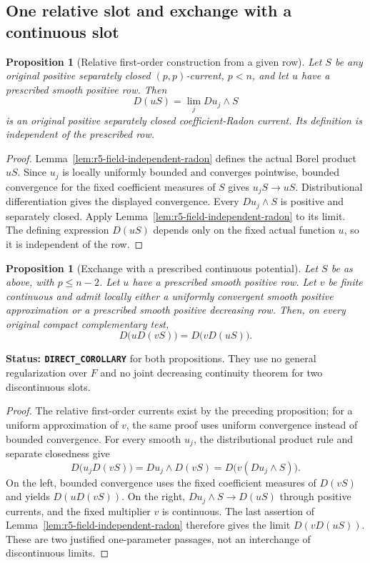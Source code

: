 \documentclass[11pt,a4paper]{article}
\numberwithin{equation}{section}
\newtheorem{proposition}[theorem]{Proposition}
\theoremstyle{definition}
\theoremstyle{remark}
\begin{document}
\subsection{One relative slot and exchange with a continuous slot}

\begin{proposition}[Relative first-order construction from a given row]
\label{prop:r5-prescribed-relative-first-order}
Let $S$ be any original positive separately closed $(p,p)$-current,
$p<n$, and let $u$ have a prescribed smooth positive row.
Then
\[
 D(uS)=\lim_j Du_j\wedge S
\]
is an original positive separately closed coefficient-Radon
current.  Its definition is independent of the prescribed row.
\end{proposition}

\begin{proof}
Lemma~\ref{lem:r5-field-independent-radon} defines the actual
Borel product $uS$.  Since $u_j$ is locally uniformly bounded
and converges pointwise, bounded convergence for the fixed
coefficient measures of $S$ gives $u_jS\to uS$.
Distributional differentiation gives the displayed convergence.
Every $Du_j\wedge S$ is positive and separately closed.
Apply Lemma~\ref{lem:r5-field-independent-radon} to its limit.
The defining expression $D(uS)$ depends only on the fixed actual
function $u$, so it is independent of the row.
\end{proof}

\begin{proposition}[Exchange with a prescribed continuous potential]
\label{prop:r5-prescribed-continuous-exchange}
Let $S$ be as above, with $p\leq n-2$.  Let $u$ have a
prescribed smooth positive row.  Let $v$ be finite continuous
and admit locally either a uniformly convergent smooth positive
approximation or a prescribed smooth positive decreasing row.
Then, on every original compact complementary test,
\[
 D\bigl(uD(vS)\bigr)=D\bigl(vD(uS)\bigr).
\]
\end{proposition}

\noindent\textbf{Status: \texttt{DIRECT\_COROLLARY}} for both
propositions.  They use no general regularization over $F$ and
no joint decreasing continuity theorem for two discontinuous slots.

\begin{proof}
The relative first-order currents exist by the preceding proposition;
for a uniform approximation of $v$, the same proof uses uniform
convergence instead of bounded convergence.  For every smooth
$u_j$, the distributional product rule and separate closedness give
\[
 D\bigl(u_jD(vS)\bigr)
    =Du_j\wedge D(vS)
    =D\bigl(v(Du_j\wedge S)\bigr).
\]
On the left, bounded convergence uses the fixed coefficient measures
of $D(vS)$ and yields $D(uD(vS))$.  On the right,
$Du_j\wedge S\to D(uS)$ through positive currents, and the
fixed multiplier $v$ is continuous.  The last assertion of
Lemma~\ref{lem:r5-field-independent-radon} therefore gives
the limit $D(vD(uS))$.  These are two justified one-parameter
passages, not an interchange of discontinuous limits.
\end{proof}
\end{document}
